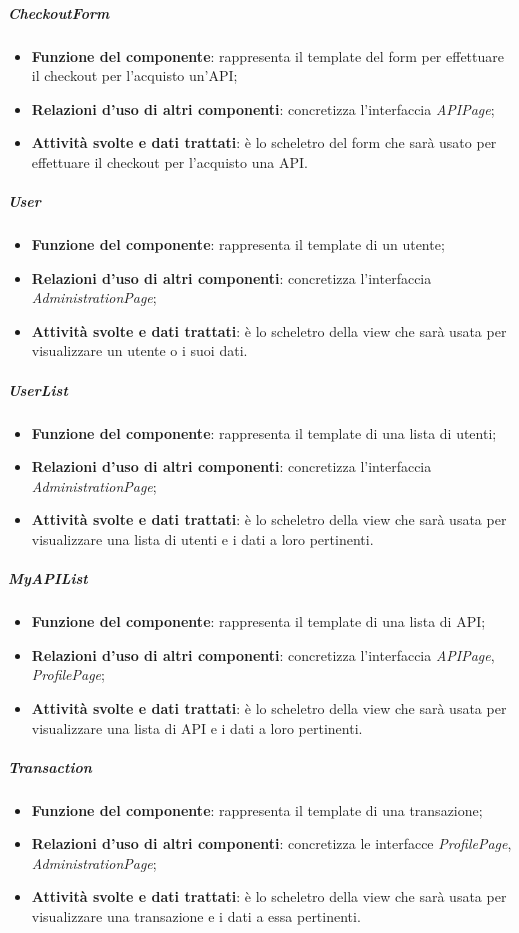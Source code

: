 \subparagraph{CheckoutForm}
\begin{itemize}
	\item \textbf{Funzione del componente}: rappresenta il template del form per effettuare il checkout per l'acquisto un'API;
	\item \textbf{Relazioni d'uso di altri componenti}: concretizza l'interfaccia \textit{APIPage};
	\item \textbf{Attività svolte e dati trattati}: è lo scheletro del form che sarà usato per effettuare il checkout per l'acquisto una API.
\end{itemize}

\subparagraph{User}
\begin{itemize}
	\item \textbf{Funzione del componente}: rappresenta il template di un utente;
	\item \textbf{Relazioni d'uso di altri componenti}: concretizza l'interfaccia \textit{AdministrationPage};
	\item \textbf{Attività svolte e dati trattati}: è lo scheletro della view che sarà usata per visualizzare un utente o i suoi dati.
\end{itemize}

\subparagraph{UserList}
\begin{itemize}
	\item \textbf{Funzione del componente}: rappresenta il template di una lista di utenti;
	\item \textbf{Relazioni d'uso di altri componenti}: concretizza l'interfaccia \textit{AdministrationPage};
	\item \textbf{Attività svolte e dati trattati}: è lo scheletro della view che sarà usata per visualizzare una lista di utenti e i dati a loro pertinenti.
\end{itemize}

\subparagraph{MyAPIList}
\begin{itemize}
	\item \textbf{Funzione del componente}: rappresenta il template di una lista di API;
	\item \textbf{Relazioni d'uso di altri componenti}: concretizza l'interfaccia \textit{APIPage}, \textit{ProfilePage};
	\item \textbf{Attività svolte e dati trattati}: è lo scheletro della view che sarà usata per visualizzare una lista di API e i dati a loro pertinenti.
\end{itemize}

\subparagraph{Transaction}
\begin{itemize}
	\item \textbf{Funzione del componente}: rappresenta il template di una transazione;
	\item \textbf{Relazioni d'uso di altri componenti}: concretizza le interfacce \textit{ProfilePage}, \textit{AdministrationPage};
	\item \textbf{Attività svolte e dati trattati}: è lo scheletro della view che sarà usata per visualizzare una transazione e i dati a essa pertinenti.
\end{itemize}


